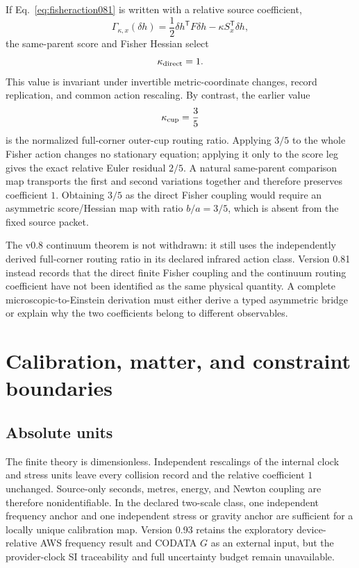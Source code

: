 \documentclass[11pt]{article}
\theoremstyle{definition}
\theoremstyle{remark}
\begin{document}
If Eq.~\eqref{eq:fisheraction081} is written with a relative source coefficient,
\begin{equation}
 \Gamma_{\kappa,x}(\delta h)
 =\frac12\delta h^{\mathsf T}F\delta h
 -\kappa S_x^{\mathsf T}\delta h,
\end{equation}
the same-parent score and Fisher Hessian select
\begin{equation}
 \kappa_{\rm direct}=1.
\end{equation}
This value is invariant under invertible metric-coordinate changes, record replication, and common action rescaling. By contrast, the earlier value
\begin{equation}
 \kappa_{\rm cup}=\frac35
\end{equation}
is the normalized full-corner outer-cup routing ratio. Applying $3/5$ to the whole Fisher action changes no stationary equation; applying it only to the score leg gives the exact relative Euler residual $2/5$. A natural same-parent comparison map transports the first and second variations together and therefore preserves coefficient $1$. Obtaining $3/5$ as the direct Fisher coupling would require an asymmetric score/Hessian map with ratio $b/a=3/5$, which is absent from the fixed source packet.

The v0.8 continuum theorem is not withdrawn: it still uses the independently derived full-corner routing ratio in its declared infrared action class. Version 0.81 instead records that the direct finite Fisher coupling and the continuum routing coefficient have not been identified as the same physical quantity. A complete microscopic-to-Einstein derivation must either derive a typed asymmetric bridge or explain why the two coefficients belong to different observables.

\section{Calibration, matter, and constraint boundaries}\label{sec:boundaries081}

\subsection{Absolute units}

The finite theory is dimensionless. Independent rescalings of the internal clock and stress units leave every collision record and the relative coefficient $1$ unchanged. Source-only seconds, metres, energy, and Newton coupling are therefore nonidentifiable. In the declared two-scale class, one independent frequency anchor and one independent stress or gravity anchor are sufficient for a locally unique calibration map. Version 0.93 retains the exploratory device-relative AWS frequency result and CODATA $G$ as an external input, but the provider-clock SI traceability and full uncertainty budget remain unavailable.
\end{document}
